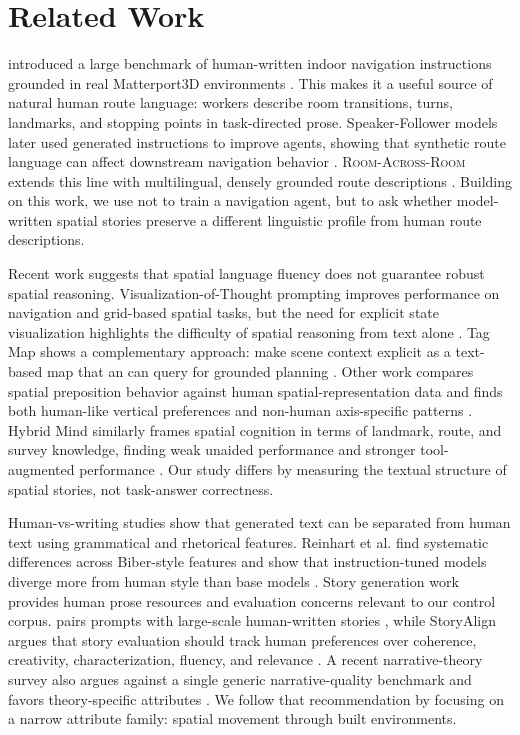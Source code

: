 \section{Related Work}
\label{sec:related}

\rtr introduced a large benchmark of human-written indoor navigation instructions grounded in real Matterport3D environments \cite{anderson2018vision}. This makes it a useful source of natural human route language: workers describe room transitions, turns, landmarks, and stopping points in task-directed prose. Speaker-Follower models later used generated instructions to improve \vln agents, showing that synthetic route language can affect downstream navigation behavior \cite{fried2018speaker}. \textsc{Room-Across-Room} extends this line with multilingual, densely grounded route descriptions \cite{ku2020room}. Building on this work, we use \rtr not to train a navigation agent, but to ask whether model-written spatial stories preserve a different linguistic profile from human route descriptions.

Recent work suggests that spatial language fluency does not guarantee robust spatial reasoning. Visualization-of-Thought prompting improves \llm performance on navigation and grid-based spatial tasks, but the need for explicit state visualization highlights the difficulty of spatial reasoning from text alone \cite{wu2024mindseye}. Tag Map shows a complementary approach: make scene context explicit as a text-based map that an \llm can query for grounded planning \cite{zhang2024tagmap}. Other work compares \llm spatial preposition behavior against human spatial-representation data and finds both human-like vertical preferences and non-human axis-specific patterns \cite{wu2025spatial}. Hybrid Mind similarly frames spatial cognition in terms of landmark, route, and survey knowledge, finding weak unaided \llm performance and stronger tool-augmented performance \cite{yang2025spatialcognition}. Our study differs by measuring the textual structure of spatial stories, not task-answer correctness.

Human-vs-\llm writing studies show that generated text can be separated from human text using grammatical and rhetorical features. Reinhart et al. find systematic differences across Biber-style features and show that instruction-tuned models diverge more from human style than base models \cite{reinhart2025llms}. Story generation work provides human prose resources and evaluation concerns relevant to our control corpus. \writingprompts pairs prompts with large-scale human-written stories \cite{fan2018hierarchical}, while StoryAlign argues that story evaluation should track human preferences over coherence, creativity, characterization, fluency, and relevance \cite{xia2026storyalign}. A recent narrative-theory survey also argues against a single generic narrative-quality benchmark and favors theory-specific attributes \cite{liu2026narrative}. We follow that recommendation by focusing on a narrow attribute family: spatial movement through built environments.
